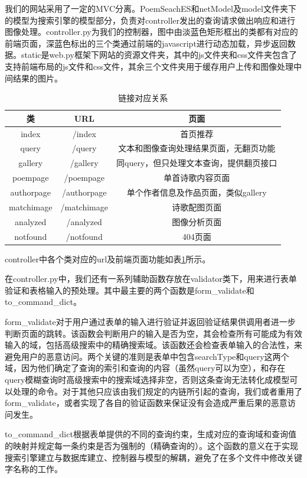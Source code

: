 \documentclass[a4paper, 10pt]{article}
\begin{document}
我们的网站采用了一定的MVC分离。PoemSeachES和netModel及model文件夹下的模型为搜索引擎的模型部分，负责对controller发出的查询请求做出响应和进行图像处理。controller.py为我们的控制器，图中由淡蓝色矩形框出的类都有对应的前端页面，深蓝色标出的三个类通过前端的javascript进行动态加载，异步返回数据。static是web.py框架下网站的资源文件夹，其中的js文件夹和css文件夹包含了支持前端布局的js文件和css文件，其余三个文件夹用于缓存用户上传和图像处理中间结果的图片。

\begin{table}[H]
\centering
\begin{tabular}{ccc}
\hline
\textbf{类} & \textbf{URL} & \textbf{页面} \\ \hline
index & /index & 首页推荐 \\
query & /query & 文本和图像查询处理结果页面，无翻页功能 \\ 
gallery & /gallery & 同query，但只处理文本查询，提供翻页接口 \\ 
poempage & /poempage & 单首诗歌内容页面 \\ 
authorpage & /authorpage & 单个作者信息及作品页面，类似gallery \\ 
matchimage & /matchimage & 诗歌配图页面 \\ 
analyzed & /analyzed & 图像分析页面 \\ 
notfound & /notfound & 404页面 \\ \hline
\end{tabular}
\caption{链接对应关系}
\label{tab:url_connect}
\end{table}

controller中各个类对应的url及前端页面功能如表\ref{tab:url_connect}所示。

在controller.py中，我们还有一系列辅助函数存放在validator类下，用来进行表单验证和表格输入的预处理。其中最主要的两个函数是form\_validate和to\_command\_dict。

form\_validate对于用户通过表单的输入进行验证并返回验证结果供调用者进一步判断页面的跳转。该函数会判断用户的输入是否为空，其会检查所有可能成为有效输入的域，包括高级搜索中的精确搜索域。该函数还会检查表单输入的合法性，来避免用户的恶意访问。两个关键的准则是表单中包含searchType和query这两个域，因为他们确定了查询的索引和查询的内容（虽然query可以为空），和存在query模糊查询时高级搜索中的搜索域选择非空，否则这条查询无法转化成模型可以处理的命令。对于其他只应该由我们规定的内链所引起的查询，我们或者重用了form\_validate，或者实现了各自的验证函数来保证没有会造成严重后果的恶意访问发生。

to\_command\_dict根据表单提供的不同的查询约束，生成对应的查询域和查询值的映射并规定每一条约束是否为强制的（精确查询的）。这个函数的意义在于实现搜索引擎建立与数据库建立、控制器与模型的解耦，避免了在多个文件中修改关键字名称的工作。
\end{document}
